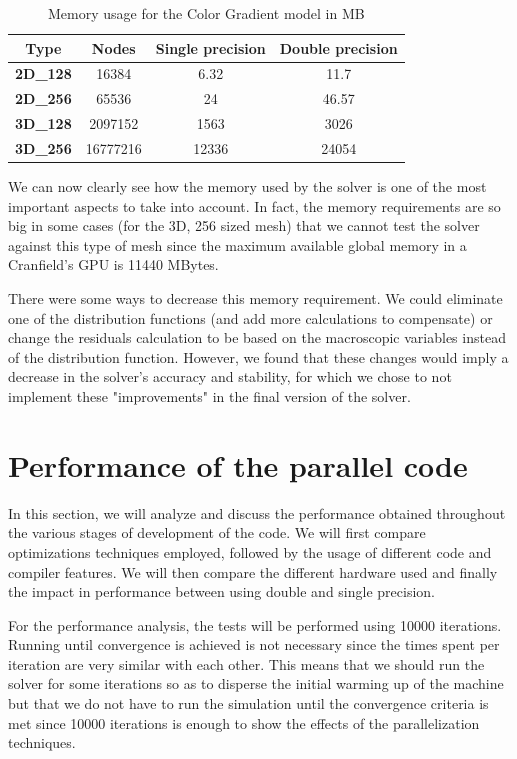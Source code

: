 \documentclass[12pt]{book}
\begin{document}
\begin{table}[H]
	\centering
	\begin{tabular}{|c|c|c|c|}
		\hline
		\textbf{Type}    & \textbf{Nodes} & \textbf{Single precision} & \textbf{Double precision} \\ \hline
		\textbf{2D\_128} & 16384          & 6.32                      & 11.7                      \\ \hline
		\textbf{2D\_256} & 65536          & 24                        & 46.57                     \\ \hline
		\textbf{3D\_128} & 2097152        & 1563                      & 3026                      \\ \hline
		\textbf{3D\_256} & 16777216       & 12336                     & 24054                     \\ \hline
	\end{tabular}
	\caption{Memory usage for the Color Gradient model in MB}
	\label{tab:memCG}
\end{table}

We can now clearly see how the memory used by the solver is one of the most important aspects to take into account. In fact, the memory requirements are so big in some cases (for the 3D, 256 sized mesh) that we cannot test the solver against this type of mesh since the maximum available global memory in a Cranfield's GPU is 11440 MBytes. \par
There were some ways to decrease this memory requirement. We could eliminate one of the distribution functions (and add more calculations to compensate) or change the residuals calculation to be based on the macroscopic variables instead of the distribution function. However, we found that these changes would imply a decrease in the solver's accuracy and stability, for which we chose to not implement these "improvements" in the final version of the solver.

\section{Performance of the parallel code}\label{sec:performance}
In this section, we will analyze and discuss the performance obtained throughout the various stages of development of the code. We will first compare optimizations techniques employed, followed by the usage of different code and compiler features. We will then compare the different hardware used and finally the impact in performance between using double and single precision. \par
For the performance analysis, the tests will be performed using 10000 iterations. Running until convergence is achieved is not necessary since the times spent per iteration are very similar with each other. This means that we should run the solver for some iterations so as to disperse the initial warming up of the machine but that we do not have to run the simulation until the convergence criteria is met since 10000 iterations is enough to show the effects of the parallelization techniques.
\end{document}
